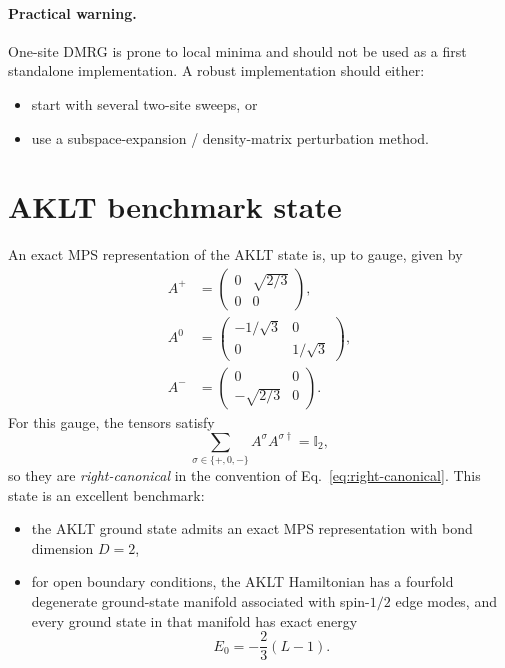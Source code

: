 \documentclass[aps,prb,onecolumn,nofootinbib]{revtex4-2}
\newcommand{\Id}{\mathbb{I}}
\begin{document}
	\paragraph{Practical warning.}
	One-site DMRG is prone to local minima and should not be used as a first standalone implementation.
	A robust implementation should either:
	\begin{itemize}
		\item start with several two-site sweeps, or
		\item use a subspace-expansion / density-matrix perturbation method.
	\end{itemize}
	
	\section{AKLT benchmark state}
	An exact MPS representation of the AKLT state is, up to gauge, given by
	\begin{align}
		A^{+} &= \begin{pmatrix} 0 & \sqrt{2/3} \\ 0 & 0 \end{pmatrix},\\
		A^{0} &= \begin{pmatrix} -1/\sqrt{3} & 0 \\ 0 & 1/\sqrt{3} \end{pmatrix},\\
		A^{-} &= \begin{pmatrix} 0 & 0 \\ -\sqrt{2/3} & 0 \end{pmatrix}.
	\end{align}
	For this gauge, the tensors satisfy
	\begin{equation}
		\sum_{\sigma\in\{+,0,-\}} A^\sigma A^{\sigma\dagger} = \Id_2,
	\end{equation}
	so they are \emph{right-canonical} in the convention of Eq.~\eqref{eq:right-canonical}.
	This state is an excellent benchmark:
	\begin{itemize}
		\item the AKLT ground state admits an exact MPS representation with bond dimension $D=2$,
		\item for open boundary conditions, the AKLT Hamiltonian has a fourfold degenerate ground-state manifold associated with spin-$1/2$ edge modes, and every ground state in that manifold has exact energy
		\[
		E_0 = -\frac23 (L-1).
		\]
	\end{itemize}
	
\end{document}
